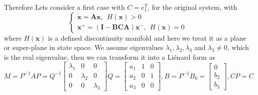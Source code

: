 \documentclass[a4paper,10pt]{article}
\begin{document}
	 Therefore Lets consider a first case with $C = e_1^T$,	for the original system, with
	 \begin{equation}
	 	\begin{cases}
	 	\dot{\mathbf{x}} =\mathbf{A} \mathbf{x} , ~~ H(\mathbf{x}) > 0 \\
	 	\mathbf{x}^+ = \mathbf{(I - BCA)}  \mathbf{x}^-, ~~ H(\mathbf{x}) = 0
	 	\end{cases}
	 \end{equation}	where $H(\mathbf{x})$ is a defined discontinuity manifold and here we treat it as a plane or super-plane in state space.
We assume  eigenvalues $\lambda_1, \lambda_2, \lambda_3$ and $\lambda_3 \neq 0$, which is the real eigenvalue, then we can transform it into a Li\'enard form as 
 \[ M = P^{-1} A P = Q^{-1} \begin{bmatrix}
 	\lambda_1 & 0 & 0\\ 0 & \lambda_2 & 0 \\ 0 & 0 & \lambda_3
 \end{bmatrix} Q= \begin{bmatrix}
 	a_1 & 1 & 0\\ a_2 & 0 & 1 \\ a_3 & 0 & 0
 \end{bmatrix}, B = P^{-1}B_0 = \begin{bmatrix}
 	0\\b_2\\b_3
 \end{bmatrix}, CP =C \]  
\end{document}
